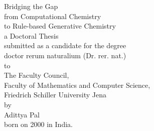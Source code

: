 \begin{center}

\vspace*{1cm}

{\LARGE Bridging the Gap}\\[0.2cm]
{\LARGE from Computational Chemistry}\\[0.2cm]
{\LARGE to Rule-based Generative Chemistry}\\[2cm]

{\large a Doctoral Thesis}\\[0.5cm]
submitted as a candidate for the degree\\[1.0cm]
{\large doctor rerum naturalium (Dr. rer. nat.)}\\[1cm]
to\\[1cm]
{\large The Faculty Council,} \\[0.2cm]
{\Large Faculty of Mathematics and Computer Science,}\\[0.2cm]
{\Large Friedrich Schiller University Jena}\\[1cm]
by \\[0.5cm]
{\large Adittya Pal}\\
born on 2000 in India. 

\end{center}
\newpage


